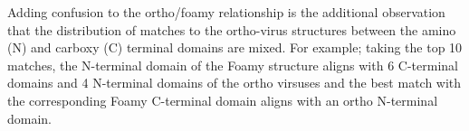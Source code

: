 \documentclass[12pt]{article}
\newcommand{\3}{$3_{10}$}
\begin{document}
Adding confusion to the ortho/foamy relationship is the additional observation that 
the distribution of matches to the ortho-virus structures between the amino (N) and carboxy
(C) terminal domains are mixed.   For example; taking the top 10 matches, the N-terminal domain of the Foamy
structure aligns with 6 C-terminal domains and 4 N-terminal domains of the ortho virsuses
and the best match with the corresponding Foamy C-terminal domain aligns with an ortho N-terminal domain.

%
% 
\end{document}
